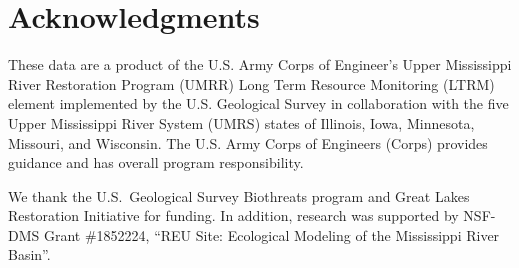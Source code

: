 \documentclass[preprint,review,12pt,authoryear]{elsarticle}
\begin{document}
\section{Acknowledgments}

These data are a product of the U.S. Army Corps of Engineer's Upper Mississippi 
River Restoration Program (UMRR) Long Term Resource Monitoring (LTRM) element 
implemented by the U.S. Geological Survey in collaboration with the five 
Upper Mississippi River System (UMRS) states of Illinois, Iowa, Minnesota, 
Missouri, and Wisconsin.
The U.S. Army Corps of Engineers (Corps) 
provides guidance and has overall program responsibility.

We thank the U.S.~Geological Survey  Biothreats program and Great
Lakes Restoration Initiative for funding.
In addition, research was supported by NSF-DMS Grant \#1852224, ``REU Site: Ecological Modeling of the Mississippi River Basin''. 


  
 
\end{document}
